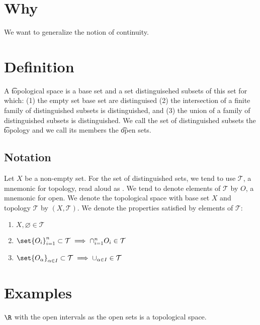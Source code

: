 
\section*{Why}

We want to generalize the notion of continuity.

\section*{Definition}

A \t{topological space} is a base set and a set distinguisehed subsets of this set for which:
(1) the empty set base set are distinguised (2) the intersection of a finite family of distinguished subsets is distinguished, and (3) the union of a family of distinguished subsets is distinguished.
We call the set of distinguished subsets the \t{topology} and we call its members the \t{open sets}.

\subsection*{Notation}

Let $X$ be a non-empty set.
For the set of distinguished sets, we tend to use $\mathcal{T} $, a mnemonic for topology, read aloud as .
We tend to denote elements of $\mathcal{T} $ by $O$, a mnemonic for open.
We denote the topological space with base set $X$ and topology $\mathcal{T} $ by $(X, \mathcal{T} )$.
We denote the properties satisfied by elements of $\mathcal{T} $:
  \begin{enumerate}
  \item $X, \varnothing \in \mathcal{T} $
  \item $\set{O_i}_{i = 1}^{n} \subset \mathcal{T}  \implies \cap_{i = 1}^{n} O_i \in \mathcal{T} $
  \item $\set{O_\alpha }_{\alpha  \in I} \subset \mathcal{T} \implies \cup_{\alpha  \in I} \in \mathcal{T} $
  \end{enumerate}

\section*{Examples}

$\R $ with the open intervals as the open sets is a topological space.
